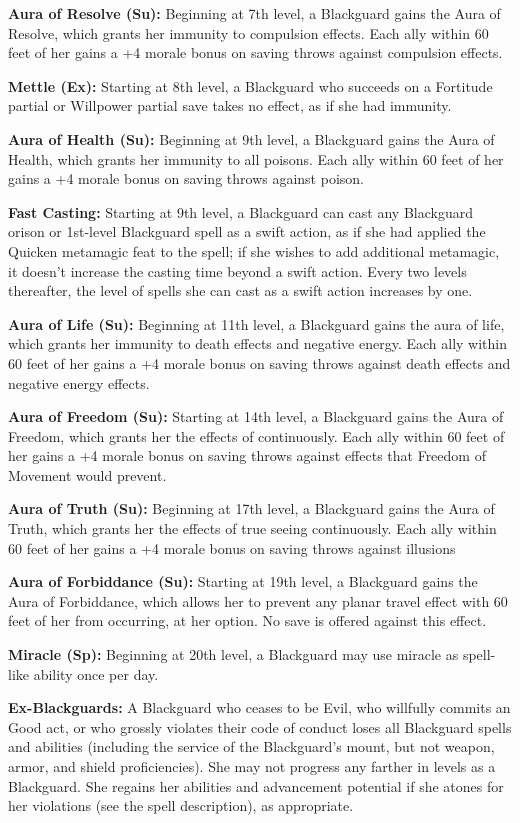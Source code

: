 \textbf{Aura of Resolve (Su):} Beginning at 7th level, a Blackguard gains the Aura of Resolve, which grants her immunity to compulsion effects. Each ally within 60 feet of her gains a +4 morale bonus on saving throws against compulsion effects.

\textbf{Mettle (Ex):} Starting at 8th level, a Blackguard who succeeds on a Fortitude partial or Willpower partial save takes no effect, as if she had immunity.

\textbf{Aura of Health (Su):} Beginning at 9th level, a Blackguard gains the Aura of Health, which grants her immunity to all poisons. Each ally within 60 feet of her gains a +4 morale bonus on saving throws against poison.

\textbf{Fast Casting:} Starting at 9th level, a Blackguard can cast any Blackguard orison or 1st-level Blackguard spell as a swift action, as if she had applied the Quicken metamagic feat to the spell; if she wishes to add additional metamagic, it doesn't increase the casting time beyond a swift action. Every two levels thereafter, the level of spells she can cast as a swift action increases by one.

\textbf{Aura of Life (Su):} Beginning at 11th level, a Blackguard gains the aura of life, which grants her immunity to death effects and negative energy. Each ally within 60 feet of her gains a +4 morale bonus on saving throws against death effects and negative energy effects.

\textbf{Aura of Freedom (Su):} Starting at 14th level, a Blackguard gains the Aura of Freedom, which grants her the effects of  continuously. Each ally within 60 feet of her gains a +4 morale bonus on saving throws against effects that Freedom of Movement would prevent.

\textbf{Aura of Truth (Su):} Beginning at 17th level, a Blackguard gains the Aura of Truth, which grants her the effects of true seeing continuously. Each ally within 60 feet of her gains a +4 morale bonus on saving throws against illusions

\textbf{Aura of Forbiddance (Su):}  Starting at 19th level, a Blackguard gains the Aura of Forbiddance, which allows her to prevent any planar travel effect with 60 feet of her from occurring, at her option. No save is offered against this effect.

\textbf{Miracle (Sp):} Beginning at 20th level, a Blackguard may use miracle as spell-like ability once per day.

\textbf{Ex-Blackguards:} A Blackguard who ceases to be Evil, who willfully commits an Good act, or who grossly violates their code of conduct loses all Blackguard spells and abilities (including the service of the Blackguard's mount, but not weapon, armor, and shield proficiencies). She may not progress any farther in levels as a Blackguard. She regains her abilities and advancement potential if she atones for her violations (see the  spell description), as appropriate.